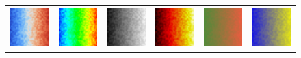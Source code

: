 \documentclass{acmsiggraph}               %
\begin{document}
\begin{figure}
\begin{tabular}{c@{\;}c@{\;}c@{\;}c@{\;}c@{\;}c}
    \includegraphics[width=1.1in]{images/Cool2WarmHfNoise} &
    \includegraphics[width=1.1in]{images/RainbowHfNoise} &
    \includegraphics[width=1.1in]{images/GrayscaleHfNoise} &
    \includegraphics[width=1.1in]{images/BlackBodyHfNoise} &
    \includegraphics[width=1.1in]{images/Green2RedHfNoise} &
    \includegraphics[width=1.1in]{images/Blue2YellowHfNoise} \\


\end{tabular}
\end{figure}
\end{document}

